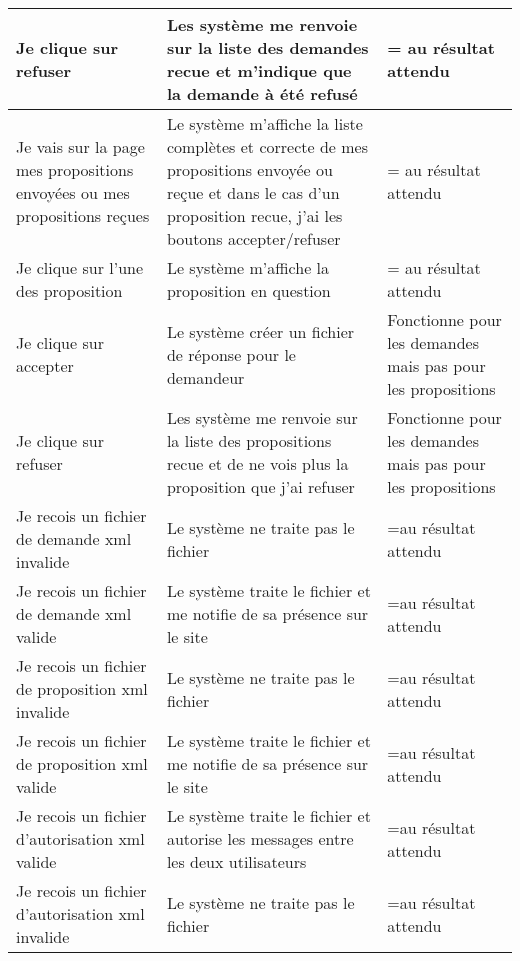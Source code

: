 \documentclass{article}
\begin{document}
\begin{center}
\begin{tabular}{|p{5cm}|p{5cm}|p{5cm}|}
      \hline
      \hline
      Je clique sur refuser&
      Les système me renvoie sur la liste des demandes recue et m'indique que la demande à été refusé&
      = au résultat attendu
      \\ 

      \hline
      \hline
      Je vais sur la page mes propositions envoyées ou mes propositions reçues&
      Le système m'affiche la liste complètes et correcte de mes propositions envoyée ou reçue et dans le cas d'un proposition recue, j'ai les boutons accepter/refuser&
      = au résultat attendu
      \\

      \hline
      \hline
      Je clique sur l'une des proposition&
      Le système m'affiche la proposition en question&
      = au résultat attendu
      \\

      \hline
      \hline
      Je clique sur accepter&
      Le système créer un fichier de réponse pour le demandeur&
      Fonctionne pour les demandes mais pas pour les propositions
      \\

      \hline
      \hline
      Je clique sur refuser&
      Les système me renvoie sur la liste des propositions recue et de ne vois plus la proposition que j'ai refuser&
      Fonctionne pour les demandes mais pas pour les propositions
      \\
      
      \hline
      \hline
      Je recois un fichier de demande xml invalide&
      Le système ne traite pas le fichier&
      =au résultat attendu\\
      
      \hline
      \hline
      Je recois un fichier de demande xml valide&
      Le système traite le fichier et me notifie de sa présence sur le site&
      =au résultat attendu\\
      
      \hline
      \hline
      Je recois un fichier de proposition xml invalide&
      Le système ne traite pas le fichier&
      =au résultat attendu\\

      \hline
      \hline
      Je recois un fichier de proposition xml valide&
      Le système traite le fichier et me notifie de sa présence sur le site&
      =au résultat attendu\\
      
       \hline
      \hline
      Je recois un fichier d'autorisation xml valide&
      Le système traite le fichier et autorise les messages entre les deux utilisateurs&
      =au résultat attendu\\
      \hline
      
             \hline
      \hline
      Je recois un fichier d'autorisation xml invalide&
       Le système ne traite pas le fichier&
	=au résultat attendu\\
      \hline

    \end{tabular}
  \end{center}
\end{document}
